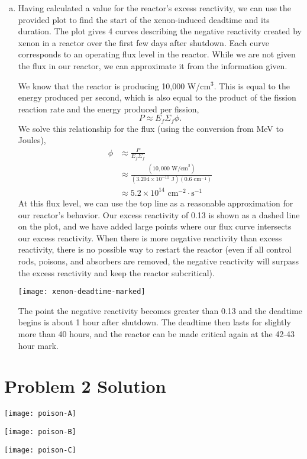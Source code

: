 \documentclass{report}
\begin{document}
\begin{enumerate}[a)]
\item Having calculated a value for the reactor's excess reactivity, we can use the provided plot to find the start of the xenon-induced deadtime and its duration. The plot gives 4 curves describing the negative reactivity created by xenon in a reactor over the first few days after shutdown. Each curve corresponds to an operating flux level in the reactor. While we are not given the flux in our reactor, we can approximate it from the information given. 

We know that the reactor is producing 10,000 W/cm$^3$. This is equal to the energy produced per second, which is also equal to the product of the fission reaction rate and the energy produced per fission,
$$ P \approx E_f \Sigma_f \phi .$$
We solve this relationship for the flux (using the conversion from MeV to Joules),
\begin{align*}
\phi	&\approx \frac{P}{E_f \Sigma_f} \\
		&\approx \frac{\left(10,000\text{ W/cm}^3\right)}{\left(3.204\times10^{-11}\text{ J}\right)\left(0.6\text{ cm}^{-1}\right)} \\
		&\approx 5.2\times10^{14}\text{ cm}^{-2}\cdot\text{s}^{-1}
\end{align*}
At this flux level, we can use the top line as a reasonable approximation for our reactor's behavior. Our excess reactivity of 0.13 is shown as a dashed line on the plot, and we have added large points where our flux curve intersects our excess reactivity. When there is more negative reactivity than excess reactivity, there is no possible way to restart the reactor (even if all control rods, poisons, and absorbers are removed, the negative reactivity will surpass the excess reactivity and keep the reactor subcritical). 

\texttt{[image: xenon-deadtime-marked]}

The point the negative reactivity becomes greater than 0.13 and the deadtime begins is about 1 hour after shutdown. The deadtime then lasts for slightly more than 40 hours, and the reactor can be made critical again at the 42-43 hour mark.


\end{enumerate}



\newpage


\section*{Problem 2 Solution}


\texttt{[image: poison-A]}

\texttt{[image: poison-B]}

\texttt{[image: poison-C]}

\end{document}
